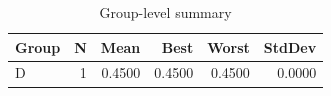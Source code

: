 \begin{table}[htbp]
\centering
\caption{Group-level summary}
\label{tab:group-summary}
\begin{tabular}{lrrrrr}
\toprule
\textbf{Group} & \textbf{N} & \textbf{Mean} & \textbf{Best} & \textbf{Worst} & \textbf{StdDev} \\
\midrule
D & 1 & 0.4500 & 0.4500 & 0.4500 & 0.0000 \\
\bottomrule
\end{tabular}
\end{table}